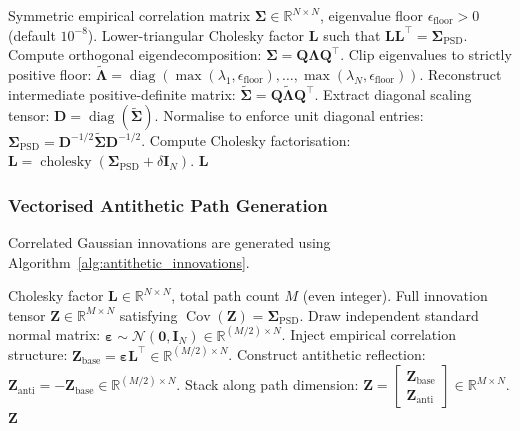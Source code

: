 \documentclass{article}
\theoremstyle{plain}
\theoremstyle{definition}
\theoremstyle{remark}
\begin{document}
\begin{algorithm}[htbp]
\caption{Higham Spectral PSD Correlation Matrix Projection}
\label{alg:higham_psd}
\begin{algorithmic}[1]
\REQUIRE Symmetric empirical correlation matrix $\mathbf{\Sigma} \in \mathbb{R}^{N \times N}$, eigenvalue floor $\epsilon_{\text{floor}} > 0$ (default $10^{-8}$).
\ENSURE Lower-triangular Cholesky factor $\mathbf{L}$ such that $\mathbf{L}\mathbf{L}^\top = \mathbf{\Sigma}_{\text{PSD}}$.
\STATE Compute orthogonal eigendecomposition: $\mathbf{\Sigma} = \mathbf{Q} \mathbf{\Lambda} \mathbf{Q}^\top$.
\STATE Clip eigenvalues to strictly positive floor: $\widetilde{\mathbf{\Lambda}} = \operatorname{diag}\left(\max(\lambda_1, \epsilon_{\text{floor}}), \dots, \max(\lambda_N, \epsilon_{\text{floor}})\right)$.
\STATE Reconstruct intermediate positive-definite matrix: $\widetilde{\mathbf{\Sigma}} = \mathbf{Q} \widetilde{\mathbf{\Lambda}} \mathbf{Q}^\top$.
\STATE Extract diagonal scaling tensor: $\mathbf{D} = \operatorname{diag}(\widetilde{\mathbf{\Sigma}})$.
\STATE Normalise to enforce unit diagonal entries: $\mathbf{\Sigma}_{\text{PSD}} = \mathbf{D}^{-1/2} \widetilde{\mathbf{\Sigma}} \mathbf{D}^{-1/2}$.
\STATE Compute Cholesky factorisation: $\mathbf{L} = \operatorname{cholesky}(\mathbf{\Sigma}_{\text{PSD}} + \delta \mathbf{I}_N)$.
\RETURN $\mathbf{L}$
\end{algorithmic}
\end{algorithm}

\subsubsection{Vectorised Antithetic Path Generation}
Correlated Gaussian innovations are generated using Algorithm~\ref{alg:antithetic_innovations}.

\begin{algorithm}[htbp]
\caption{Correlated Antithetic Innovation Tensor Construction}
\label{alg:antithetic_innovations}
\begin{algorithmic}[1]
\REQUIRE Cholesky factor $\mathbf{L} \in \mathbb{R}^{N \times N}$, total path count $M$ (even integer).
\ENSURE Full innovation tensor $\mathbf{Z} \in \mathbb{R}^{M \times N}$ satisfying $\operatorname{Cov}(\mathbf{Z}) = \mathbf{\Sigma}_{\text{PSD}}$.
\STATE Draw independent standard normal matrix: $\boldsymbol{\varepsilon} \sim \mathcal{N}(\mathbf{0}, \mathbf{I}_N) \in \mathbb{R}^{(M/2) \times N}$.
\STATE Inject empirical correlation structure: $\mathbf{Z}_{\text{base}} = \boldsymbol{\varepsilon} \mathbf{L}^\top \in \mathbb{R}^{(M/2) \times N}$.
\STATE Construct antithetic reflection: $\mathbf{Z}_{\text{anti}} = -\mathbf{Z}_{\text{base}} \in \mathbb{R}^{(M/2) \times N}$.
\STATE Stack along path dimension: $\mathbf{Z} = \begin{bmatrix} \mathbf{Z}_{\text{base}} \\ \mathbf{Z}_{\text{anti}} \end{bmatrix} \in \mathbb{R}^{M \times N}$.
\RETURN $\mathbf{Z}$
\end{algorithmic}
\end{algorithm}
\end{document}
